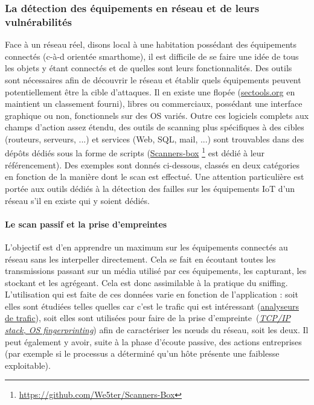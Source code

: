 \documentclass[]{article}
\begin{document}
\subsubsection{La détection des équipements en réseau et de leurs vulnérabilités}

Face à un réseau réel, disons local à une habitation possédant des équipements connectés (c-à-d orientée smarthome), il est difficile de se faire une idée de tous les objets y étant connectés et de quelles sont leurs fonctionnalités. Des outils sont nécessaires afin de découvrir le réseau et établir quels équipements peuvent potentiellement être la cible d'attaques. Il en existe une flopée (\href{https://sectools.org/}{sectools.org} en maintient un classement fourni), libres ou commerciaux, possédant une interface graphique ou non, fonctionnels sur des OS variés. Outre ces logiciels complets aux champs d'action assez étendu, des outils de scanning plus spécifiques à des cibles (routeurs, serveurs, ...) et services (Web, SQL, mail, ...) sont trouvables dans des dépôts dédiés sous la forme de scripts (\href{https://github.com/We5ter/Scanners-Box}{Scanners-box} \footnote{\url{https://github.com/We5ter/Scanners-Box}} est dédié à leur référencement). Des exemples sont donnés ci-dessous, classés en deux catégories \cite{Leos2014} en fonction de la manière dont le scan est effectué. Une attention particulière est portée aux outils dédiés à la détection des failles sur les équipements IoT d'un réseau s'il en existe qui y soient dédiés.

\paragraph{Le scan passif et la prise d'empreintes}

L'objectif est d'en apprendre un maximum sur les équipements connectés au réseau sans les interpeller directement. Cela se fait en écoutant toutes les transmissions passant sur un média utilisé par ces équipements, les capturant, les stockant et les agrégeant. Cela est donc assimilable à la pratique du sniffing. L'utilisation qui est faite de ces données varie en fonction de l'application : soit elles sont étudiées telles quelles car c'est le trafic qui est intéressant (\href{https://en.wikipedia.org/wiki/Packet_analyzer}{analyseurs de trafic}), soit elles sont utilisées pour faire de la \og prise d'empreinte\fg \ (\href{https://en.wikipedia.org/wiki/TCP/IP_stack_fingerprinting}{\textit{TCP/IP stack, OS fingerprinting}}) afin de caractériser les nœuds du réseau, soit les deux. Il peut également y avoir, suite à la phase d'écoute passive, des actions entreprises (par exemple si le processus a déterminé qu'un hôte présente une faiblesse exploitable).\\
\end{document}
